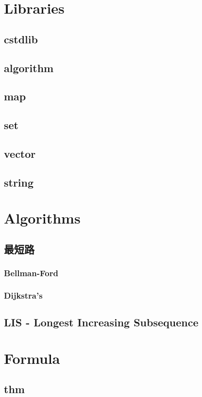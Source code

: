 \section{Libraries}
    \subsection{cstdlib}
        
    \subsection{algorithm}
        
    \subsection{map}
    \subsection{set}
    \subsection{vector}
    \subsection{string}

\section{Algorithms}
    \subsection{最短路}
        \subsubsection{Bellman-Ford}
        \subsubsection{Dijkstra’s}
    \subsection{LIS - Longest Increasing Subsequence}

\section{Formula}
    \subsection{thm}
        